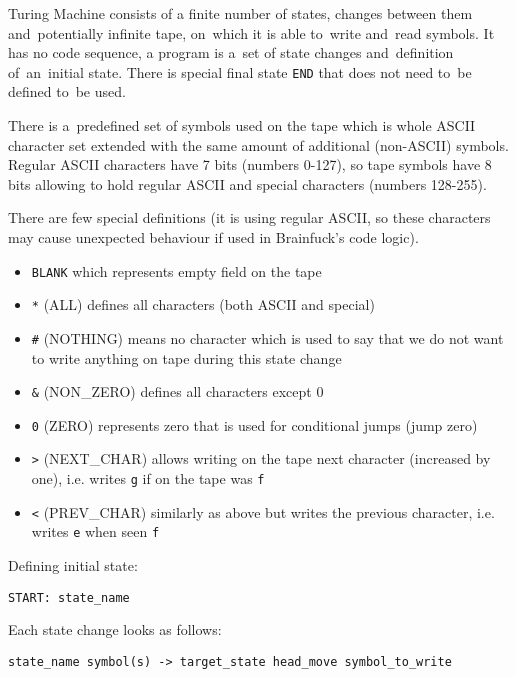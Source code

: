 \documentclass[english,shortabstract,mgr]{iithesis}
\begin{document}
Turing Machine consists of a finite number of states, changes between them
and~potentially infinite tape, on~which it is able to~write and~read symbols.
It has no code sequence, a program is a~set of state changes and~definition
of~an~initial state. There is special final state \texttt{END} that does not need
        to~be defined to~be used.

There is a~predefined set of symbols used on the tape which is whole ASCII character set
extended with the same amount of additional (non-ASCII) symbols. Regular
ASCII characters have 7 bits (numbers 0-127), so tape symbols have 8 bits
allowing to hold regular ASCII and special characters (numbers 128-255).

        There are few special definitions (it is using regular ASCII, so
these characters may cause unexpected behaviour if used in Brainfuck's
code logic).

\begin{itemize}
  \item \texttt{BLANK} which represents empty field on the tape
  \item \texttt{*} (ALL) defines all characters (both ASCII and special)
  \item \texttt{\#} (NOTHING) means no character which is used to say
                   that we do not want to write anything on tape during
                   this state change
          \item \texttt{\&} (NON\_ZERO) defines all characters except 0
          \item \texttt{0} (ZERO) represents zero that is used for conditional jumps
           (jump zero)
          \item \texttt{>} (NEXT\_CHAR) allows writing on the tape next character
                   (increased by one), i.e. writes \texttt{g} if on the tape
                   was \texttt{f}
  \item \texttt{<} (PREV\_CHAR) similarly as above but writes the previous character,
                   i.e. writes \texttt{e} when seen \texttt{f}
\end{itemize}

Defining initial state:
\begin{verbatim}
START: state_name
\end{verbatim}

Each state change looks as follows:
\begin{verbatim}
state_name symbol(s) -> target_state head_move symbol_to_write
\end{verbatim}
\end{document}
